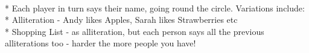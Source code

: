 \begin{minipage}{\textwidth}
\\*
Each player in turn says their name, going round the circle. Variations include:\\*
Alliteration - Andy likes Apples, Sarah likes Strawberries etc\\*
Shopping List - as alliteration, but each person says all the previous alliterations too - harder the more people you have!
\end{minipage}    \vfill
